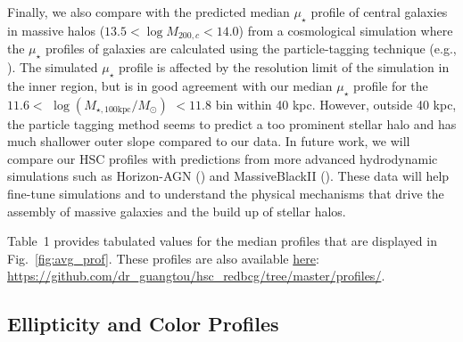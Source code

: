 \documentclass[a4paper,fleqn,usenatbib]{mnras}
\def\logmtot{{$\log (M_{\star,100\mathrm{kpc}}/M_{\odot})$}}
\def\mden{{$\mu_{\star}$}}
\begin{document}
    Finally, we also compare with the predicted median \mden{} profile of central 
    galaxies in massive halos ($13.5 < \log M_{200,c} < 14.0$) from a cosmological 
    simulation where the \mden{} profiles of galaxies are calculated using the 
    particle-tagging technique (e.g., \citealt{Cooper2010}). 
    The simulated \mden{} profile is affected by the resolution limit of the simulation in the inner region, but  is in good agreement with our median \mden{} profile for 
    the $11.6 <$ \logmtot{} $< 11.8$ bin within 40 kpc. 
    However, outside 40 kpc, the particle tagging method seems to predict a too 
    prominent stellar halo and has much shallower outer slope compared to our data. In future work, we will compare  our HSC profiles with  predictions from more advanced 
    hydrodynamic simulations such as Horizon-AGN () and MassiveBlackII (). These data will help fine-tune simulations and to understand the physical mechanisms that drive the assembly of massive galaxies and the 
    build up of stellar halos.

    Table~1 provides tabulated values for the median profiles that are 
    displayed in Fig.~\ref{fig:avg_prof}. 
    These profiles are also available  
    \href{https://github.com/dr-guangtou/hsc_redbcg/tree/master/profiles}{here}:
    {\url{https://github.com/dr_guangtou/hsc_redbcg/tree/master/profiles/}}.
    

\subsection{Ellipticity and Color Profiles}
    \label{ssec:ell_color}
    
\end{document}
